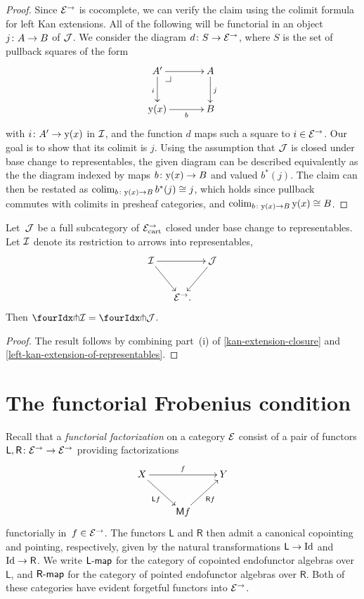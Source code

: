 \documentclass[reqno,10pt,a4paper,oneside,draft]{amsart}
\newcommand{\LL}{\mathsf{L}}
\newcommand{\RR}{\mathsf{R}}
\newcommand{\MM}{\mathsf{M}}
\begin{document}
{{\begin{proof}
Since $\catE^\to$ is cocomplete, we can verify the claim using the colimit formula for left Kan extensions.
All of the following will be functorial in an object $j \co A \to B$ of $\cal{J}$.
We consider the diagram $d \co S \to \catE^\to$, where $S$ is the set of pullback squares of the form
\[
\xymatrix@C=1.2cm{
  A'
  \ar[r]
  \ar[d]_{i}
  \pullback{dr}
&
  A
  \ar[d]^{j}
\\
  \yon(x)
  \ar[r]_-{b}
&
  B
}
\]
with $i \co A' \to \yon(x)$ in $\cal{I}$, and the function $d$ maps such a square to $i \in \cal{E}^\to$.
Our goal is to show that its colimit is $j$.
Using the assumption that $\cal{J}$ is closed under base change to representables, the given diagram can be described equivalently as the the diagram indexed by maps $b \co \yon(x) \to B$ and valued $b^*(j)$.
The claim can then be restated as $\colim_{b \co \yon(x) \to B} b^*(j) \iso j$, which holds since pullback commutes with colimits in presheaf categories, and $\colim_{b \co \yon(x) \to B} \yon(x) \iso B$.
\end{proof}

\begin{proposition} \label{awfs-on-arrows-into-representables}
Let~$\cal{J}$ be a full subcategory of $\catE_{\cart}^\to$ closed under base change to representables.
Let $\cal{I}$ denote its restriction to arrows into representables,
\[
\xymatrix@C-1em{
  \cal{I}
  \ar[rr]
  \ar[dr]
&&
  \cal{J}
  \ar[dl]
\\&
  \catE^\to
\rlap{.}}
\]
Then $\liftr{\cal{I}} = \liftr{\cal{J}}$.
\end{proposition}

\begin{proof}
The result follows by combining part~(i) of \cref{kan-extension-closure} and \cref{left-kan-extension-of-representables}.
\end{proof}

\section{The functorial Frobenius condition}
\label{sec:frobc}

Recall that a \emph{functorial factorization} on a category $\cal{E}$ consist of a pair of functors $\LL, \RR \co \cal{E}^\to \to \cal{E}^\to$ providing factorizations
\[
\xymatrix{
  X
  \ar[rr]^{f}
  \ar[dr]_{\LL f}
&&
  Y
\\&
  \MM f
  \ar[ur]_{\RR f}
}
\]
functorially in~$f \in \cal{E}^\to$. The functors $\LL$ and $\RR$ then admit a canonical copointing and pointing, respectively, given by the natural transformations $\LL \to \Id$ and $\Id \to \RR$. 
We write $\pcoalg{\LL}$ for the category of copointed endofunctor algebras over $\LL$, and $\palg{\RR}$  for the category of pointed endofunctor algebras over $\RR$.  Both of these categories have evident forgetful functors into $\cal{E}^\to$.

}}
\end{document}
